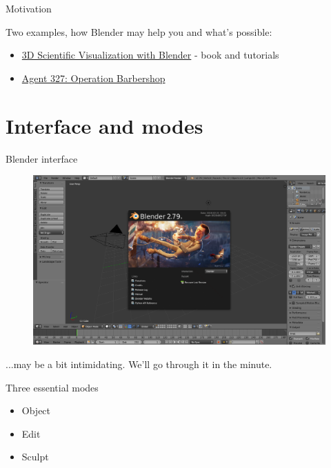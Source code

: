\documentclass{beamer}
\begin{document}
\begin{frame}{Motivation}

Two examples, how Blender may help you and what's possible:
\begin{itemize}
\item \href{https://www.cv.nrao.edu/~bkent/blender/index.html}{3D Scientific Visualization with Blender} - book and tutorials
\item \href{https://agent327.com/}{Agent 327: Operation Barbershop}
\end{itemize}

\end{frame}

\section{Interface and modes}

\begin{frame}{Blender interface}

\begin{figure}
\includegraphics[scale=0.25]{interface.png}
\end{figure}

...may be a bit intimidating. We'll go through it in the minute.

\end{frame}

\begin{frame}{Three essential modes}

\begin{itemize}
\item Object
\item Edit
\item Sculpt
\end{itemize}

\end{frame}
\end{document}
